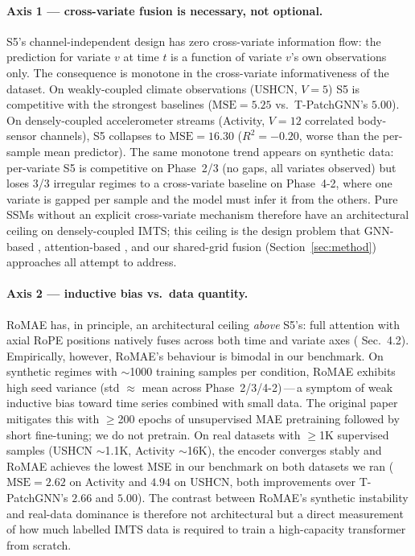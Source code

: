 \paragraph{Axis 1 --- cross-variate fusion is necessary, not optional.}
S5's channel-independent design has zero cross-variate information flow: the
prediction for variate $v$ at time $t$ is a function of variate $v$'s own
observations only. The consequence is monotone in the cross-variate
informativeness of the dataset. On weakly-coupled climate observations
(USHCN, $V{=}5$) S5 is competitive with the strongest baselines
($\text{MSE}{=}5.25$ vs.\ T-PatchGNN's $5.00$). On densely-coupled
accelerometer streams (Activity, $V{=}12$ correlated body-sensor channels),
S5 collapses to $\text{MSE}{=}16.30$ ($R^2{=}{-}0.20$, worse than the
per-sample mean predictor). The same monotone trend appears on synthetic
data: per-variate S5 is competitive on Phase~2/3 (no gaps, all variates
observed) but loses 3/3 irregular regimes to a cross-variate baseline on
Phase~4-2, where one variate is gapped per sample and the model must
infer it from the others. Pure SSMs without an explicit cross-variate
mechanism therefore have an architectural ceiling on densely-coupled IMTS;
this ceiling is the design problem that GNN-based
\citep{zhang2024irregular}, attention-based \citep{zivanovic2025rotary}, and
our shared-grid fusion (Section~\ref{sec:method}) approaches all attempt to
address.

\paragraph{Axis 2 --- inductive bias vs.\ data quantity.}
RoMAE has, in principle, an architectural ceiling \emph{above} S5's: full
attention with axial RoPE positions natively fuses across both time and
variate axes (\citet{zivanovic2025rotary} Sec.~4.2). Empirically, however,
RoMAE's behaviour is bimodal in our benchmark. On synthetic regimes with
$\sim$1000 training samples per condition, RoMAE exhibits high seed variance
(std $\approx$ mean across Phase~2/3/4-2)\,---\,a symptom of weak inductive
bias toward time series combined with small data. The original paper
mitigates this with $\geq$200 epochs of unsupervised MAE pretraining
followed by short fine-tuning; we do not pretrain. On real datasets with
$\geq$1K supervised samples (USHCN $\sim$1.1K, Activity $\sim$16K), the
encoder converges stably and RoMAE achieves the lowest MSE in our benchmark
on both datasets we ran ($\text{MSE}{=}2.62$ on Activity and $4.94$ on USHCN,
both improvements over T-PatchGNN's $2.66$ and $5.00$). The contrast between RoMAE's synthetic
instability and real-data dominance is therefore not architectural but a
direct measurement of how much labelled IMTS data is required to train a
high-capacity transformer from scratch.

